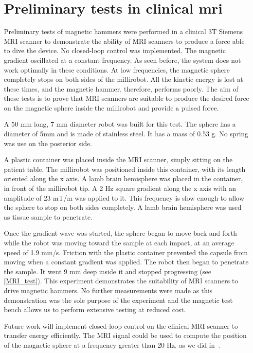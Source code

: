 \documentclass[letterpaper, 10 pt, conference]{ieeeconf}  %
\begin{document}
\section{Preliminary tests in clinical mri}
\label{MRI_tests}
Preliminary tests of magnetic hammers were performed in a clinical 3T Siemens MRI scanner to demonstrate the ability of MRI scanners to produce a force able to dive the device.
No closed-loop control was implemented. 
The magnetic gradient  oscillated at a constant frequency. 
As seen before, the system does not work optimally in these conditions. 
At low frequencies, the magnetic sphere completely stops on both sides of the millirobot. 
All the kinetic energy is lost at these times, and the magnetic hammer, therefore, performs poorly. 
The aim of these tests is to prove that MRI scanners are suitable to produce the desired force on the magnetic sphere inside the millirobot and provide a pulsed force.\par
A 50 mm long, 7 mm diameter robot was built for this test. The sphere has a diameter of 5mm and is made of stainless steel. It has a mass of 0.53 g. No spring was use on the posterior side.\par
A plastic container was placed inside the MRI scanner, simply sitting on the patient table. The millirobot was positioned inside this container, with its length oriented along the x axis. A lamb brain hemisphere was placed in the container, in front of the millirobot tip.
A 2 Hz square gradient along the x axis with an amplitude of 23 mT/m was applied to it. 
This frequency is slow enough to allow the sphere to stop on both sides completely. 
A lamb brain hemisphere was used as tissue sample to penetrate.\par
Once the gradient wave was started, the sphere began to move back and forth while the robot was moving toward the sample at each impact, at an average speed of 1.9 mm/s. Friction with the plastic container prevented the capsule from moving when a constant gradient was applied. 
 The robot then began to penetrate the sample. It went 9 mm deep inside it and stopped progressing (see \cref{MRI_test}). 
This experiment demonstrates the suitability of MRI scanners to drive magnetic hammers. No further measurements were made as this demonstration was the sole purpose of the experiment and the magnetic test bench allows us to perform extensive testing at reduced cost.\par
Future work will implement closed-loop control on the clinical MRI scanner to transfer energy efficiently. 
The MRI signal could be used to compute the position of the magnetic sphere at a frequency greater than 20 Hz, as we did in~\cite{578}.
\end{document}
